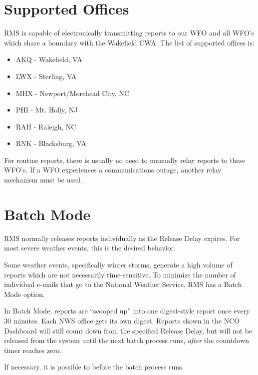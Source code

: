 \documentclass[pdflatex,letterpaper,twoside,12pt]{book}
\begin{document}

\section{Supported Offices}\label{rms-offices}

RMS is capable of electronically transmitting reports to our WFO and all WFO's which share a boundary with the Wakefield CWA.  The list of supported offices is:

\begin{itemize}
\item AKQ - Wakefield, VA
\item LWX - Sterling, VA
\item MHX - Newport/Morehead City, NC
\item PHI - Mt. Holly, NJ
\item RAH - Raleigh, NC
\item RNK - Blacksburg, VA
\end{itemize}

For routine reports, there is usually no need to manually relay reports to these WFO's.  If a WFO experiences a communications outage, another relay mechanism must be used.


\section{Batch Mode}\label{rms-batch-mode}

RMS normally releases reports individually as the Release Delay expires.  For most severe weather events, this is the desired behavior.

Some weather events, specifically winter storms, generate a high volume of reports which are not necessarily time-sensitive.  To minimize the number of individual e-mails that go to the National Weather Service, RMS has a Batch Mode option.

In Batch Mode, reports are ``scooped up'' into one digest-style report once every 30 minutes.  Each NWS office gets its own digest.  Reports shown in the NCO Dashboard  will still count down from the specified Release Delay, but will not be released from the system until the next batch process runs, \emph{after} the countdown timer reaches zero.

If necessary, it is possible to  before the batch process runs.
\end{document}
